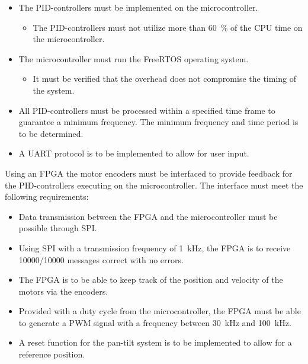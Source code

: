 \documentclass[../../main.tex]{subfiles}
\begin{document}
\begin{itemize}
    \item The PID-controllers must be implemented on the microcontroller.
    \begin{itemize}
        \item The PID-controllers must not utilize more than \SI{60}{\percent} of the CPU time on the microcontroller.
    \end{itemize}
    \item The microcontroller must run the FreeRTOS operating system.
    \begin{itemize}
        \item It must be verified that the overhead does not compromise the timing of the system.
    \end{itemize}
    \item All PID-controllers must be processed within a specified time frame to guarantee a minimum frequency. The minimum frequency and time period is to be determined.
    
    \item A UART protocol is to be implemented to allow for user input.
\end{itemize}
Using an FPGA the motor encoders must be interfaced to provide feedback for the PID-controllers executing on the microcontroller. The interface must meet the following requirements:
\begin{itemize}
    \item Data transmission between the FPGA and the microcontroller must be possible through SPI.
    \item Using SPI with a transmission frequency of \SI{1}{\kilo\hertz}, the FPGA is to receive 10000/10000 messages correct with no errors.
    \item The FPGA is to be able to keep track of the position and velocity of the motors via the encoders.
    \item Provided with a duty cycle from the microcontroller, the FPGA must be able to generate a PWM signal with a frequency between \SI{30}{\kilo\hertz} and \SI{100}{\kilo\hertz}.
    \item A reset function for the pan-tilt system is to be implemented to allow for a reference position.
\end{itemize}
\end{document}
